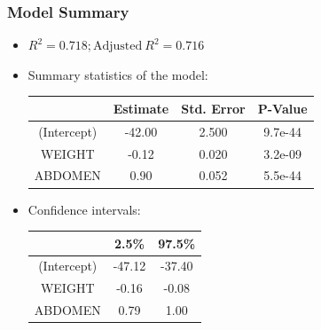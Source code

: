 \documentclass{beamer}
\begin{document}
\begin{frame}
\frametitle{Model Summary}
\begin{itemize}
	\item $R^2 = 0.718; \text{Adjusted}\ R^2 = 0.716$
	
	\item Summary statistics of the model:
	\begin{table}
		\centering
		\begin{tabular}{cccc}   %
			\toprule
			& Estimate &	Std. Error	&  P-Value\\  
			\midrule        %
			 (Intercept) & -42.00  & 2.500  & 9.7e-44 \\
			 WEIGHT & -0.12	  & 0.020  & 3.2e-09 \\
			 ABDOMEN & 0.90  & 0.052  & 5.5e-44 \\
			\bottomrule
		\end{tabular}
	\end{table}

	\item Confidence intervals:
	\begin{table}
		\centering
		\begin{tabular}{ccc}   %
			\toprule
			& 2.5\% &	97.5\% \\  
			\midrule        %
			(Intercept) & -47.12 &	-37.40 \\
			WEIGHT & -0.16 &	-0.08 \\
			ABDOMEN & 0.79  &	1.00\\
			\bottomrule
		\end{tabular}
	\end{table}

\end{itemize}
\end{frame}

\end{document}
